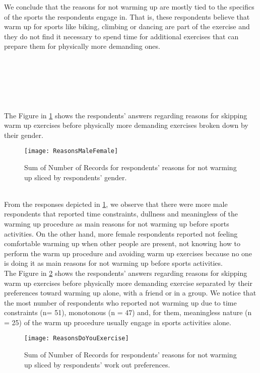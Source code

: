 We conclude that the reasons for not warming up are mostly tied to the specifics of the sports the respondents engage in. That is, these respondents believe that warm up for sports like biking, climbing or dancing are part of the exercise and they do not find it necessary to spend time for additional exercises that can prepare them for physically more demanding ones.\\\\\\\\\\\\ \\The Figure in \ref{fig:ReasonsMaleFemale} shows the respondents' answers regarding reasons for skipping warm up exercises before physically more demanding exercises broken down by their gender.
\begin{figure}[h]
    \centering
    \texttt{[image: ReasonsMaleFemale]}
    \caption{Sum of Number of Records for respondents' reasons for not warming up sliced by respondents' gender.}
    \label{fig:ReasonsMaleFemale}
\end{figure}\\
From the responses depicted in \ref{fig:ReasonsMaleFemale}, we observe that there were more male respondents that reported time constraints, dullness and meaningless of the warming up procedure as main reasons for not warming up before sports activities. On the other hand, more female respondents reported not feeling comfortable warming up when other people are present, not knowing how to perform the warm up procedure and avoiding warm up exercises because no one is doing it as main reasons for not warming up before sports activities. \\ The Figure in \ref{fig:ReasonsDoYouExercise} shows the respondents' answers regarding reasons for skipping warm up exercises before physically more demanding exercise separated by their preferences toward warming up alone, with a friend or in a group. We notice that the most number of respondents who reported not warming up due to time constraints (n= 51), monotonous (n = 47) and, for them, meaningless nature (n = 25) of the warm up procedure usually engage in sports activities alone. 
\begin{figure}[h]
    \centering
    \texttt{[image: ReasonsDoYouExercise]}
    \caption{Sum of Number of Records for respondents' reasons for not warming up sliced by respondents' work out preferences.}
    \label{fig:ReasonsDoYouExercise}
\end{figure}\\
